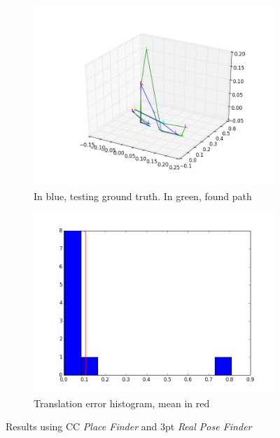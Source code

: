 \begin{figure}[htpb]
  \begin{subfigure}[b]{6cm}
          \includegraphics[width=\linewidth]{img/desktop_2_CC_3pt_path_1.png}
          \caption{In blue, testing ground truth. In green, found path}                
          \label{fig:desktop_2_CC_3pt_path_1}
  \end{subfigure}   
  \qquad
  \begin{subfigure}[b]{6cm}
          \includegraphics[width=\linewidth]{img/desktop_2_CC_3pt_dist_1.png}
          \caption{Translation error histogram, mean in red} 
          \label{fig:desktop_2_CC_3pt_dist_1}
  \end{subfigure}
  \caption{Results using CC \textit{Place Finder} and 3pt  \textit{Real Pose Finder}}
\end{figure}

